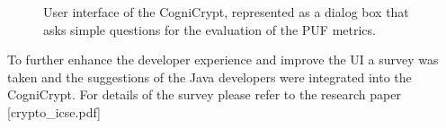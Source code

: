 \begin{figure}
\centering
{}
\caption{User interface of the CogniCrypt, represented as a dialog box that asks simple questions for the evaluation of the PUF metrics.}
\label{img:cogni_ui}
\end{figure}

To further enhance the developer experience and improve the UI a survey was taken and the suggestions of the Java developers were integrated into the CogniCrypt. For details of the survey please refer to the research paper [crypto\_icse.pdf]

